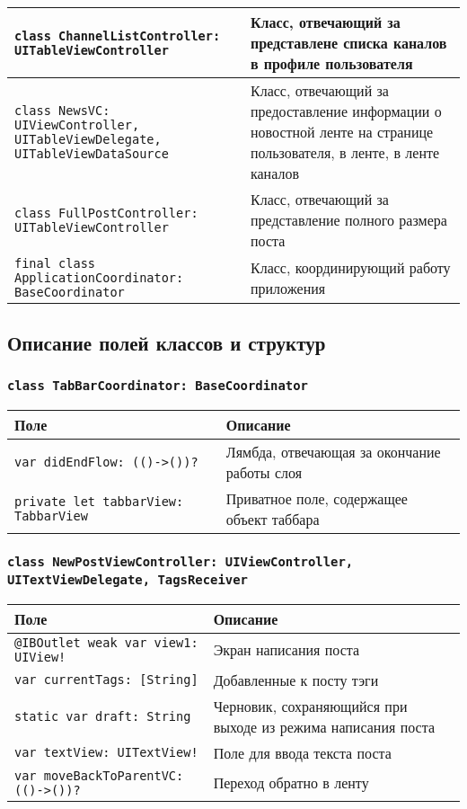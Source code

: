 \begin{longtable}{| >{\raggedright\arraybackslash}p{} | p{}|}
\texttt{class ChannelListController: UITableViewController} & {Класс, отвечающий за представлене списка каналов в профиле пользователя} \\ \hline
\texttt{class NewsVC: UIViewController, UITableViewDelegate, UITableViewDataSource} & {Класс, отвечающий за предоставление информации о новостной ленте на странице пользователя, в ленте, в ленте каналов} \\ \hline
\texttt{class FullPostController: UITableViewController} & {Класс, отвечающий за представление полного размера поста} \\ \hline
\texttt{final class ApplicationCoordinator: BaseCoordinator} & {Класс, координирующий работу приложения} \\ \hline
\end{longtable}


\subsection*{Описание полей классов и структур}

\subsubsection*{\texttt{class TabBarCoordinator: BaseCoordinator}}

\begin{longtable}{| >{\raggedright\arraybackslash}p{} | p{}|}
\hline
\textbf{Поле} & \textbf{Описание} \\ \hline
\texttt{var didEndFlow: (()->())?} & {Лямбда, отвечающая за окончание работы слоя} \\ \hline
\texttt{private let tabbarView: TabbarView} & {Приватное поле, содержащее объект таббара} \\ \hline
\end{longtable}

\subsubsection*{\texttt{class NewPostViewController: UIViewController, UITextViewDelegate, TagsReceiver}}

\begin{longtable}{| >{\raggedright\arraybackslash}p{} | p{}|}
\hline
\textbf{Поле} & \textbf{Описание} \\ \hline
\texttt{@IBOutlet weak var view1: UIView!} & {Экран написания поста} \\ \hline
\texttt{var currentTags: [String] } & {Добавленные к посту тэги} \\ \hline
\texttt{static var draft: String } & {Черновик, сохраняющийся при выходе из режима написания поста} \\ \hline
\texttt{var textView: UITextView!} & {Поле для ввода текста поста} \\ \hline
\texttt{var moveBackToParentVC: (()->())?} & {Переход обратно в ленту} \\ \hline
\end{longtable}

